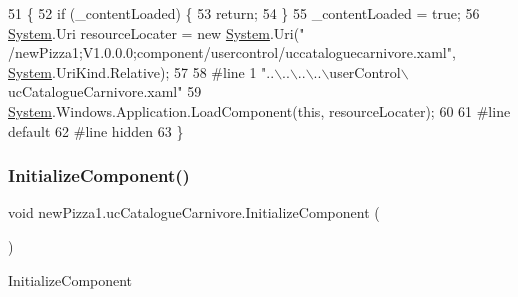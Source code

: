 \begin{DoxyCode}
51                                           \{
52             \textcolor{keywordflow}{if} (\_contentLoaded) \{
53                 \textcolor{keywordflow}{return};
54             \}
55             \_contentLoaded = \textcolor{keyword}{true};
56             \hyperlink{namespaceSystem}{System}.Uri resourceLocater = \textcolor{keyword}{new} \hyperlink{namespaceSystem}{System}.Uri(\textcolor{stringliteral}{"
      /newPizza1;V1.0.0.0;component/usercontrol/uccataloguecarnivore.xaml"}, \hyperlink{namespaceSystem}{System}.UriKind.Relative);
57             
58 \textcolor{preprocessor}{            #line 1 "..\(\backslash\)..\(\backslash\)..\(\backslash\)..\(\backslash\)userControl\(\backslash\)ucCatalogueCarnivore.xaml"
}
59             \hyperlink{namespaceSystem}{System}.Windows.Application.LoadComponent(\textcolor{keyword}{this}, resourceLocater);
60             
61 \textcolor{preprocessor}{            #line default
}
62 \textcolor{preprocessor}{            #line hidden
}
63         \}
\end{DoxyCode}
\mbox{\label{classnewPizza1_1_1ucCatalogueCarnivore_ae3fbe460c9b1305f8cd5d685e12746ae}} 
\subsubsection{\texorpdfstring{Initialize\+Component()}{InitializeComponent()}\hspace{0.1cm}{\footnotesize\ttfamily [2/6]}}
{\footnotesize\ttfamily void new\+Pizza1.\+uc\+Catalogue\+Carnivore.\+Initialize\+Component (\begin{DoxyParamCaption}{ }\end{DoxyParamCaption})\hspace{0.3cm}{\ttfamily [inline]}}



Initialize\+Component 


